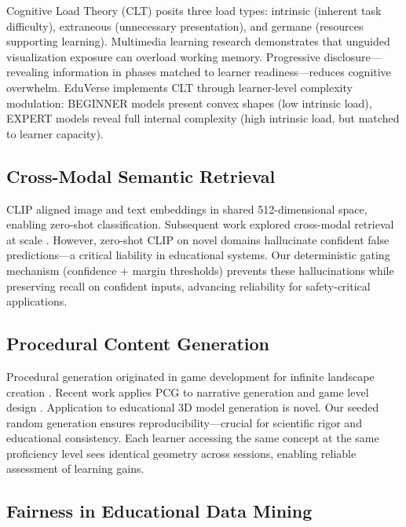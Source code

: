 \documentclass[conference]{IEEEtran}
\begin{document}
Cognitive Load Theory (CLT) \cite{sweller1994cognitive, kirschner2006cognitive} posits three load types: intrinsic (inherent task difficulty), extraneous (unnecessary presentation), and germane (resources supporting learning). Multimedia learning research \cite{mayer2009multimedia, clark2008learning} demonstrates that unguided visualization exposure can overload working memory. Progressive disclosure---revealing information in phases matched to learner readiness---reduces cognitive overwhelm. EduVerse implements CLT through learner-level complexity modulation: BEGINNER models present convex shapes (low intrinsic load), EXPERT models reveal full internal complexity (high intrinsic load, but matched to learner capacity).

\subsection{Cross-Modal Semantic Retrieval}

CLIP \cite{radford2021learning} aligned image and text embeddings in shared 512-dimensional space, enabling zero-shot classification. Subsequent work explored cross-modal retrieval at scale \cite{liu2021clipretrieval}. However, zero-shot CLIP on novel domains hallucinate confident false predictions---a critical liability in educational systems. Our deterministic gating mechanism (confidence + margin thresholds) prevents these hallucinations while preserving recall on confident inputs, advancing reliability for safety-critical applications.

\subsection{Procedural Content Generation}

Procedural generation originated in game development for infinite landscape creation \cite{togelius2016search}. Recent work applies PCG to narrative generation \cite{lee2025adaptive} and game level design \cite{summerville2016procedural}. Application to educational 3D model generation is novel. Our seeded random generation ensures reproducibility---crucial for scientific rigor and educational consistency. Each learner accessing the same concept at the same proficiency level sees identical geometry across sessions, enabling reliable assessment of learning gains.

\subsection{Fairness in Educational Data Mining}
\end{document}
